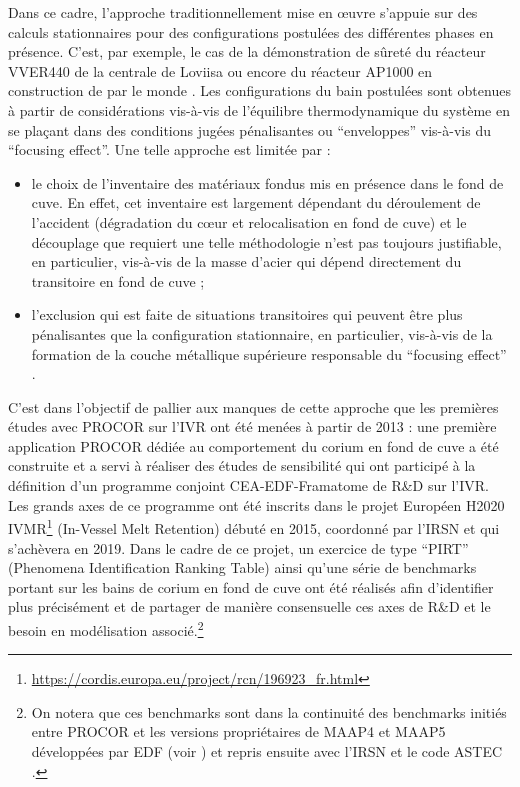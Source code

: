 Dans ce cadre, l'approche traditionnellement mise en \oe{}uvre s'appuie sur des calculs stationnaires pour des configurations postulées des différentes phases en présence. C'est, par exemple, le cas de la démonstration de sûreté du réacteur VVER440 de la centrale de Loviisa \cite{Kymalainen1997} ou encore du réacteur AP1000 en construction de par le monde \cite{Esmaili2004}. Les configurations du bain postulées sont obtenues à partir de considérations vis-à-vis de l'équilibre thermodynamique du système en se plaçant dans des conditions jugées pénalisantes ou ``enveloppes'' vis-à-vis du ``focusing effect''. Une telle approche est limitée par :
\begin{itemize}
 \item le choix de l'inventaire des matériaux fondus mis en présence dans le fond de cuve. En effet, cet inventaire est largement dépendant du déroulement de l'accident (dégradation du c\oe ur et relocalisation en fond de cuve) et le découplage que requiert une telle méthodologie n'est pas toujours justifiable, en particulier, vis-à-vis de la masse d'acier qui dépend directement du transitoire en fond de cuve \cite{Seiler2014} ;
 \item l’exclusion qui est faite de situations transitoires qui peuvent être plus pénalisantes que la configuration stationnaire, en particulier, vis-à-vis de la formation de la couche métallique supérieure responsable du ``focusing effect'' \cite{Rempe1998}.
\end{itemize}

C'est dans l'objectif de pallier aux manques de cette approche que les premières études avec PROCOR sur l'IVR ont été menées à partir de 2013 : une première application PROCOR dédiée au comportement du corium en fond de cuve a été construite et a servi à réaliser des études de sensibilité \cite{LeTellier2014} qui ont participé à la définition d'un programme conjoint CEA-EDF-Framatome de R\&D sur l'IVR. Les grands axes de ce programme ont été inscrits dans le projet Européen H2020 IVMR\footnote{\url{https://cordis.europa.eu/project/rcn/196923_fr.html}} (In-Vessel Melt Retention) débuté en 2015, coordonné par l'IRSN et qui s'achèvera en 2019. Dans le cadre de ce projet, un exercice de type ``PIRT'' (Phenomena Identification Ranking Table) \cite{Carenini2019a} ainsi qu'une série de benchmarks portant sur les bains de corium en fond de cuve \cite{Carenini2019} ont été réalisés afin d'identifier plus précisément et de partager de manière consensuelle ces axes de R\&D et le besoin en modélisation associé.\footnote{On notera que ces benchmarks sont dans la continuité des benchmarks initiés entre PROCOR et les versions propriétaires de MAAP4 \cite{maap4} et MAAP5 \cite{maap5} développées par EDF (voir \cite{Bakouta2015}) et repris ensuite avec l'IRSN et le code ASTEC \cite{Carenini2014}.}

